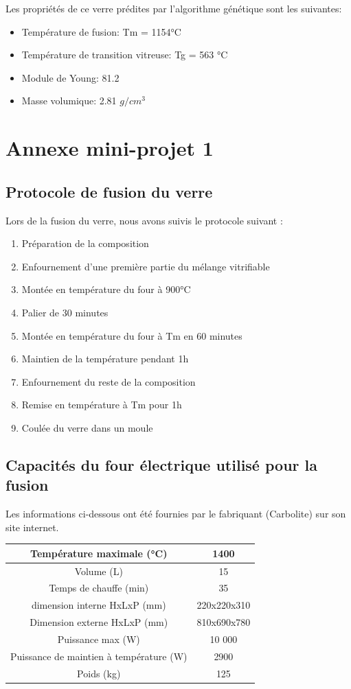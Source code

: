 \documentclass{article}
\begin{document}
Les propriétés de ce verre prédites par l'algorithme génétique sont les suivantes:
\begin{itemize}
    \item Température de fusion: Tm = 1154°C
    \item Température de transition vitreuse: Tg = 563 °C 
    \item Module de Young: 81.2
    \item Masse volumique: 2.81 $g/cm^{3}$
\end{itemize}

\section{Annexe mini-projet 1}
\subsection{Protocole de fusion du verre}

Lors de la fusion du verre, nous avons suivis le protocole suivant :

\begin{enumerate}
    \item Préparation de la composition
    \item Enfournement d'une première partie du mélange vitrifiable
    \item Montée en température du four à 900°C
    \item Palier de 30 minutes
    \item Montée en température du four à Tm en 60 minutes
    \item Maintien de la température pendant 1h
    \item Enfournement du reste de la composition
    \item Remise en température à Tm pour 1h
    \item Coulée du verre dans un moule
\end{enumerate}

\subsection{Capacités du four électrique utilisé pour la fusion}

Les informations ci-dessous ont été fournies par le fabriquant (Carbolite) sur son site internet.

\begin{tabular}{|c|c|}
\hline
Température maximale (°C) & 1400  \\
\hline
Volume (L) & 15 \\
\hline
Temps de chauffe (min) & 35 \\
\hline
dimension interne HxLxP (mm) & 220x220x310 \\
\hline
Dimension externe HxLxP (mm) & 810x690x780 \\
\hline
Puissance max (W) & 10 000 \\
\hline
Puissance de maintien à température (W) & 2900 \\
\hline
Poids (kg) & 125 \\
\hline
\end{tabular} 
\end{document}
